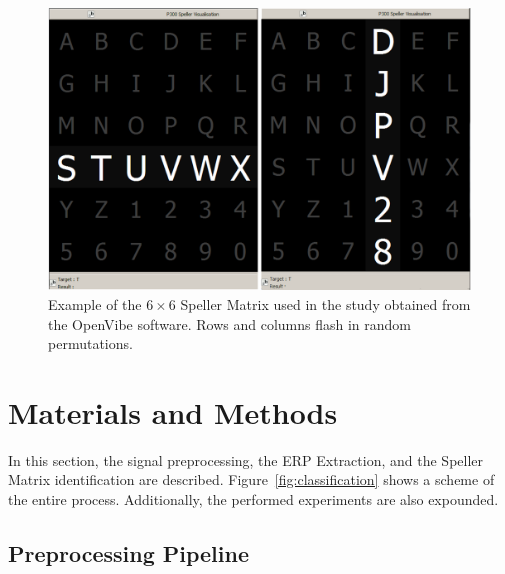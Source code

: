 \begin{figure}[h!]
\centering
\includegraphics[width=15cm]{images/openvibep300matrix.png}
\caption[P300 Speller Matrix]{Example of the $6 \times 6$ Speller Matrix used in the study obtained from the OpenVibe software.  Rows and columns flash in random permutations.}
\label{fig:p300matrix}
\end{figure}



\section{Materials and Methods}

In this section, the signal preprocessing, the ERP Extraction, and the Speller Matrix identification are described.  Figure~\ref{fig:classification} shows a scheme of the entire process. Additionally, the performed experiments are also expounded.

\subsection{Preprocessing Pipeline} \label{Pipeline}

